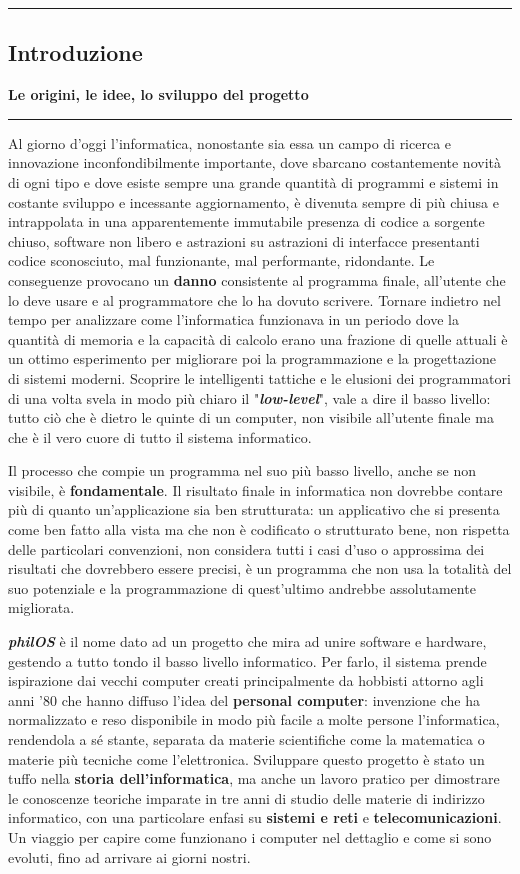 {\color{gray}\hrule}
\begin{center}
\section{Introduzione}
\textbf{Le origini, le idee, lo sviluppo del progetto}
\bigskip
\end{center}
{\color{gray}\hrule}

Al giorno d'oggi l'informatica\cite{Bowker1985}, nonostante sia essa un campo di ricerca e innovazione inconfondibilmente importante, dove sbarcano costantemente novità di ogni tipo e dove esiste sempre una grande quantità di programmi e sistemi in costante sviluppo e incessante aggiornamento, è divenuta sempre di più chiusa e intrappolata in una apparentemente immutabile presenza di codice a sorgente chiuso, software non libero e astrazioni su astrazioni di interfacce presentanti codice sconosciuto, mal funzionante, mal performante, ridondante. Le conseguenze provocano un \textbf{danno} consistente al programma finale, all'utente che lo deve usare e al programmatore che lo ha dovuto scrivere. Tornare indietro nel tempo per analizzare come l'informatica funzionava in un periodo dove la quantità di memoria e la capacità di calcolo erano una frazione di quelle attuali è un ottimo esperimento per migliorare poi la programmazione e la progettazione di sistemi moderni. Scoprire le intelligenti tattiche e le elusioni dei programmatori di una volta svela in modo più chiaro il "\textbf{\textit{low-level}}", vale a dire il basso livello: tutto ciò che è dietro le quinte di un computer, non visibile all'utente finale ma che è il vero cuore di tutto il sistema informatico.

Il processo che compie un programma nel suo più basso livello, anche se non visibile, è \textbf{fondamentale}.
Il risultato finale in informatica non dovrebbe contare più di quanto un'applicazione sia ben strutturata: un applicativo che si presenta come ben fatto alla vista ma che non è codificato o strutturato bene, non rispetta delle particolari convenzioni, non considera tutti i casi d'uso o approssima dei risultati che dovrebbero essere precisi, è un programma che non usa la totalità del suo potenziale e la programmazione di quest'ultimo andrebbe assolutamente migliorata.

\textbf{\textit{philOS}} è il nome dato ad un progetto che mira ad unire software e hardware, gestendo a tutto tondo il basso livello informatico. Per farlo, il sistema prende ispirazione dai vecchi computer creati principalmente da hobbisti attorno agli anni '80 che hanno diffuso l'idea del \textbf{personal computer}: invenzione che ha normalizzato e reso disponibile in modo più facile a molte persone l'informatica, rendendola a sé stante, separata da materie scientifiche come la matematica o materie più tecniche come l'elettronica. Sviluppare questo progetto è stato un tuffo nella \textbf{storia dell'informatica}, ma anche un lavoro pratico per dimostrare le conoscenze teoriche imparate in tre anni di studio delle materie di indirizzo informatico, con una particolare enfasi su \textbf{sistemi e reti} e \textbf{telecomunicazioni}. Un viaggio per capire come funzionano i computer nel dettaglio e come si sono evoluti, fino ad arrivare ai giorni nostri.

